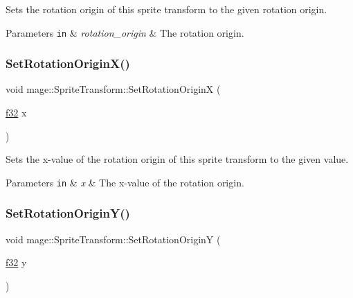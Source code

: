 Sets the rotation origin of this sprite transform to the given rotation origin.


\begin{DoxyParams}[1]{Parameters}
\mbox{\tt in}  & {\em rotation\+\_\+origin} & The rotation origin. \\
\hline
\end{DoxyParams}
\hypertarget{structmage_1_1_sprite_transform_a06cf658cf8c901324f050255edc82b71}{}\label{structmage_1_1_sprite_transform_a06cf658cf8c901324f050255edc82b71} 
\subsubsection{\texorpdfstring{Set\+Rotation\+Origin\+X()}{SetRotationOriginX()}}
{\footnotesize\ttfamily void mage\+::\+Sprite\+Transform\+::\+Set\+Rotation\+OriginX (\begin{DoxyParamCaption}\item[{\hyperlink{namespacemage_a6a44ad388483959dc4dff9f2aef91431}{f32}}]{x }\end{DoxyParamCaption})\hspace{0.3cm}{\ttfamily [noexcept]}}

Sets the x-\/value of the rotation origin of this sprite transform to the given value.


\begin{DoxyParams}[1]{Parameters}
\mbox{\tt in}  & {\em x} & The x-\/value of the rotation origin. \\
\hline
\end{DoxyParams}
\hypertarget{structmage_1_1_sprite_transform_a6c78eca9b59c9dc79e60921efcc11969}{}\label{structmage_1_1_sprite_transform_a6c78eca9b59c9dc79e60921efcc11969} 
\subsubsection{\texorpdfstring{Set\+Rotation\+Origin\+Y()}{SetRotationOriginY()}}
{\footnotesize\ttfamily void mage\+::\+Sprite\+Transform\+::\+Set\+Rotation\+OriginY (\begin{DoxyParamCaption}\item[{\hyperlink{namespacemage_a6a44ad388483959dc4dff9f2aef91431}{f32}}]{y }\end{DoxyParamCaption})\hspace{0.3cm}{\ttfamily [noexcept]}}

